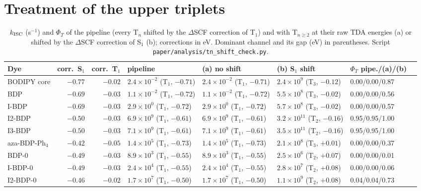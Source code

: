 \section{Treatment of the upper triplets}
\begin{table}
  \caption{$k_\mathrm{ISC}$ (s$^{-1}$) and $\Phi_T$ of the pipeline (every T$_n$ shifted by the $\Delta$SCF correction of T$_1$)
  and with T$_{n\ge2}$ at their raw TDA energies (a) or shifted by the $\Delta$SCF correction of S$_1$ (b); corrections in eV. Dominant channel and its
  gap (eV) in parentheses. Script \texttt{paper/analysis/tn\_shift\_check.py}.}
  \label{tab:tnshift}
  \scriptsize\setlength{\tabcolsep}{2pt}
  \begin{tabular}{lrrlllll}
    \toprule
    Dye & corr.\ S$_1$ & corr.\ T$_1$ & pipeline & (a) no shift & (b) S$_1$ shift & $\Phi_T$ pipe./(a)/(b) \\
    \midrule
    BODIPY core & $-0.77$ & $-0.02$ & $2.4\times10^{-2}$ (T$_1$, $-0.71$) & $2.4\times10^{-2}$ (T$_1$, $-0.71$) & $2.4\times10^{9}$ (T$_3$, $-0.12$) & 0.00/0.00/0.87 \\
    BDP & $-0.69$ & $-0.03$ & $1.1\times10^{-2}$ (T$_1$, $-0.72$) & $1.1\times10^{-2}$ (T$_1$, $-0.72$) & $5.5\times10^{8}$ (T$_3$, $-0.02$) & 0.00/0.00/0.56 \\
    I-BDP & $-0.69$ & $-0.03$ & $2.9\times10^{0}$ (T$_1$, $-0.72$) & $2.9\times10^{0}$ (T$_1$, $-0.72$) & $5.7\times10^{8}$ (T$_3$, $-0.02$) & 0.00/0.00/0.57 \\
    I2-BDP & $-0.50$ & $-0.03$ & $6.9\times10^{9}$ (T$_1$, $-0.61$) & $6.9\times10^{9}$ (T$_1$, $-0.61$) & $3.2\times10^{11}$ (T$_2$, $-0.16$) & 0.95/0.95/1.00 \\
    I3-BDP & $-0.50$ & $-0.03$ & $7.1\times10^{9}$ (T$_1$, $-0.61$) & $7.1\times10^{9}$ (T$_1$, $-0.61$) & $3.5\times10^{11}$ (T$_2$, $-0.16$) & 0.95/0.95/1.00 \\
    aza-BDP-Ph$_4$ & $-0.42$ & $-0.05$ & $1.4\times10^{5}$ (T$_1$, $-0.73$) & $1.4\times10^{5}$ (T$_1$, $-0.73$) & $2.1\times10^{8}$ (T$_3$, $+0.01$) & 0.00/0.00/0.37 \\
    BDP-0 & $-0.49$ & $-0.03$ & $8.9\times10^{3}$ (T$_1$, $-0.55$) & $8.9\times10^{3}$ (T$_1$, $-0.55$) & $2.5\times10^{6}$ (T$_2$, $+0.07$) & 0.00/0.00/0.01 \\
    I-BDP-0 & $-0.49$ & $-0.03$ & $2.4\times10^{4}$ (T$_1$, $-0.55$) & $2.4\times10^{4}$ (T$_1$, $-0.55$) & $2.8\times10^{7}$ (T$_2$, $+0.08$) & 0.00/0.00/0.06 \\
    I2-BDP-0 & $-0.46$ & $-0.02$ & $1.7\times10^{7}$ (T$_1$, $-0.50$) & $1.7\times10^{7}$ (T$_1$, $-0.50$) & $1.1\times10^{9}$ (T$_2$, $+0.08$) & 0.04/0.04/0.73 \\

\end{tabular}
\end{table}
